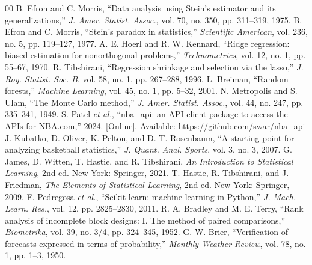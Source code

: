 \documentclass[conference]{IEEEtran}
\begin{document}
\begin{thebibliography}{00}
 B. Efron and C. Morris, ``Data analysis using Stein's estimator and its generalizations,'' \textit{J. Amer. Statist. Assoc.}, vol. 70, no. 350, pp. 311--319, 1975.
 B. Efron and C. Morris, ``Stein's paradox in statistics,'' \textit{Scientific American}, vol. 236, no. 5, pp. 119--127, 1977.
 A. E. Hoerl and R. W. Kennard, ``Ridge regression: biased estimation for nonorthogonal problems,'' \textit{Technometrics}, vol. 12, no. 1, pp. 55--67, 1970.
 R. Tibshirani, ``Regression shrinkage and selection via the lasso,'' \textit{J. Roy. Statist. Soc. B}, vol. 58, no. 1, pp. 267--288, 1996.
 L. Breiman, ``Random forests,'' \textit{Machine Learning}, vol. 45, no. 1, pp. 5--32, 2001.
 N. Metropolis and S. Ulam, ``The Monte Carlo method,'' \textit{J. Amer. Statist. Assoc.}, vol. 44, no. 247, pp. 335--341, 1949.
 S. Patel \textit{et al.}, ``nba\_api: an API client package to access the APIs for NBA.com,'' 2024. [Online]. Available: \url{https://github.com/swar/nba_api}
 J. Kubatko, D. Oliver, K. Pelton, and D. T. Rosenbaum, ``A starting point for analyzing basketball statistics,'' \textit{J. Quant. Anal. Sports}, vol. 3, no. 3, 2007.
 G. James, D. Witten, T. Hastie, and R. Tibshirani, \textit{An Introduction to Statistical Learning}, 2nd ed. New York: Springer, 2021.
 T. Hastie, R. Tibshirani, and J. Friedman, \textit{The Elements of Statistical Learning}, 2nd ed. New York: Springer, 2009.
 F. Pedregosa \textit{et al.}, ``Scikit-learn: machine learning in Python,'' \textit{J. Mach. Learn. Res.}, vol. 12, pp. 2825--2830, 2011.
 R. A. Bradley and M. E. Terry, ``Rank analysis of incomplete block designs: I. The method of paired comparisons,'' \textit{Biometrika}, vol. 39, no. 3/4, pp. 324--345, 1952.
 G. W. Brier, ``Verification of forecasts expressed in terms of probability,'' \textit{Monthly Weather Review}, vol. 78, no. 1, pp. 1--3, 1950.
\end{thebibliography}
\end{document}
